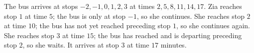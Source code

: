 The bus arrives at stops $-2,-1,0,1,2,3$ at times $2,5,8,11,14,17$. Zia reaches stop $1$ at time $5$; the bus is only at stop $-1$, so she continues. She reaches stop $2$ at time $10$; the bus has not yet reached preceding stop $1$, so she continues again. She reaches stop $3$ at time $15$; the bus has reached and is departing preceding stop $2$, so she waits. It arrives at stop $3$ at time $\boxed{17}$ minutes.
